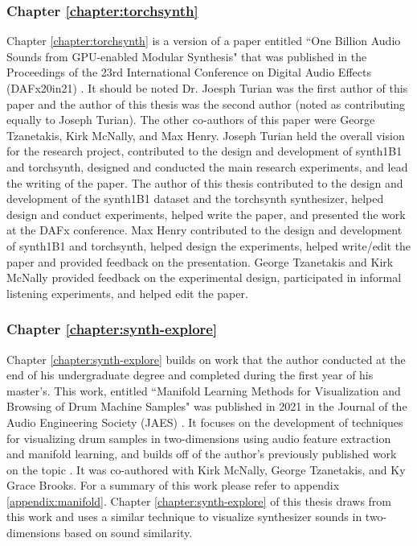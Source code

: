 \subsubsection{Chapter \ref{chapter:torchsynth}}
Chapter \ref{chapter:torchsynth} is a version of a paper entitled ``One Billion Audio Sounds from GPU-enabled Modular Synthesis" that was published in the Proceedings of the 23rd International Conference on Digital Audio Effects (DAFx20in21) \cite{turian2021one}. It should be noted Dr. Joesph Turian was the first author of this paper and the author of this thesis was the second author (noted as contributing equally to Joseph Turian). The other co-authors of this paper were George Tzanetakis, Kirk McNally, and Max Henry. Joseph Turian held the overall vision for the research project, contributed to the design and development of synth1B1 and torchsynth, designed and conducted the main research experiments, and lead the writing of the paper. The author of this thesis contributed to the design and development of the synth1B1 dataset and the torchsynth synthesizer, helped design and conduct experiments, helped write the paper, and presented the work at the DAFx conference. Max Henry contributed to the design and development of synth1B1 and torchsynth, helped design the experiments, helped write/edit the paper and provided feedback on the presentation. George Tzanetakis and Kirk McNally provided feedback on the experimental design, participated in informal listening experiments, and helped edit the paper.

\subsubsection{Chapter \ref{chapter:synth-explore}}
Chapter \ref{chapter:synth-explore} builds on work that the author conducted at the end of his undergraduate degree and completed during the first year of his master's. This work, entitled ``Manifold Learning Methods for Visualization and Browsing of Drum Machine Samples" was published in 2021 in the Journal of the Audio Engineering Society (JAES) \cite{shier2021manifold}. It focuses on the development of techniques for visualizing drum samples in two-dimensions using audio feature extraction and manifold learning, and builds off of the author's previously published work on the topic \cite{shier2017analysis, shier2017sieve}. It was co-authored with Kirk McNally, George Tzanetakis, and Ky Grace Brooks. For a summary of this work please refer to appendix \ref{appendix:manifold}. Chapter \ref{chapter:synth-explore} of this thesis draws from this work and uses a similar technique to visualize synthesizer sounds in two-dimensions based on sound similarity.

